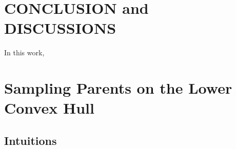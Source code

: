 \section{CONCLUSION and DISCUSSIONS}
\label{sec:conclusion}
In this work, 

%
%
%
%
\section{Sampling Parents on the Lower Convex Hull}

\subsection{Intuitions}
\label{sec:candidate_parent_intuition}

